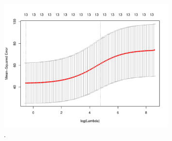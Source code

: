 \documentclass{article}
\begin{document}
\begin{figure}[htb]
	\begin{center}
		\includegraphics[width=0.8\textwidth]{MTH522_hw7_p1_1.pdf}
	\end{center}
	\caption{.}
	\label{fig:MTH522_hw7_p1_1}
\end{figure}

\newpage
\end{document}
